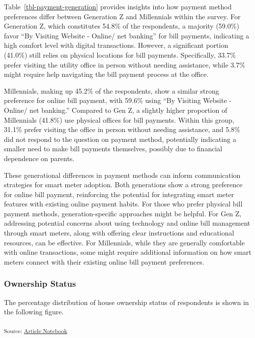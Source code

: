\documentclass[
  letterpaper,
  DIV=11,
  numbers=noendperiod]{scrartcl}
\begin{document}
Table~\ref{tbl-payment-generation} provides insights into how payment
method preferences differ between Generation Z and Millennials within
the survey. For Generation Z, which constitutes 54.8\% of the
respondents, a majority (59.0\%) favor ``By Visiting Website - Online/
net banking'' for bill payments, indicating a high comfort level with
digital transactions. However, a significant portion (41.0\%) still
relies on physical locations for bill payments. Specifically, 33.7\%
prefer visiting the utility office in person without needing assistance,
while 3.7\% might require help navigating the bill payment process at
the office.

Millennials, making up 45.2\% of the respondents, show a similar strong
preference for online bill payment, with 59.6\% using ``By Visiting
Website - Online/ net banking.'' Compared to Gen Z, a slightly higher
proportion of Millennials (41.8\%) use physical offices for bill
payments. Within this group, 31.1\% prefer visiting the office in person
without needing assistance, and 5.8\% did not respond to the question on
payment method, potentially indicating a smaller need to make bill
payments themselves, possibly due to financial dependence on parents.

These generational differences in payment methods can inform
communication strategies for smart meter adoption. Both generations show
a strong preference for online bill payment, reinforcing the potential
for integrating smart meter features with existing online payment
habits. For those who prefer physical bill payment methods,
generation-specific approaches might be helpful. For Gen Z, addressing
potential concerns about using technology and online bill management
through smart meters, along with offering clear instructions and
educational resources, can be effective. For Millennials, while they are
generally comfortable with online transactions, some might require
additional information on how smart meters connect with their existing
online bill payment preferences.

\subsubsection{Ownership Status}\label{ownership-status}

The percentage distribution of house ownership status of respondents is
shown in the following figure.

\textsubscript{Source:
\href{https://sijuswamyresearch.github.io/SM-project/index-preview.html}{Article
Notebook}}
\end{document}
